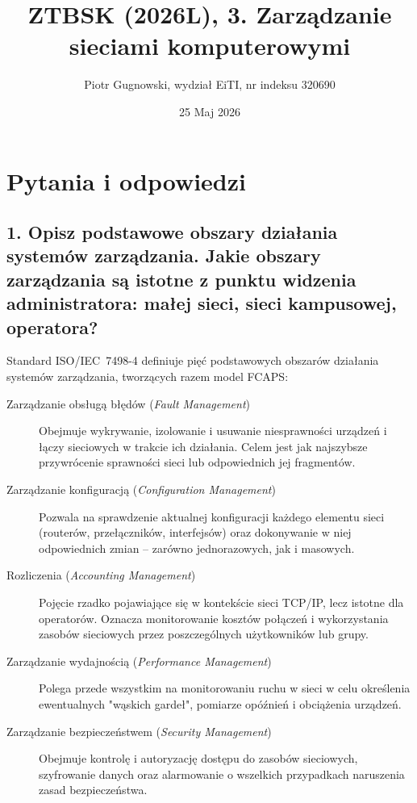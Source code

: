 \documentclass[12pt,a4paper]{article}
\title{ZTBSK (2026L), 3. Zarządzanie sieciami komputerowymi}
\author{Piotr Gugnowski, wydział EiTI, nr indeksu 320690}
\date{25 Maj 2026}
\begin{document}
\maketitle

\section*{Pytania i odpowiedzi}

\subsection*{1. Opisz podstawowe obszary działania systemów zarządzania. Jakie
obszary zarządzania są istotne z punktu widzenia administratora: małej sieci,
sieci kampusowej, operatora?}

Standard ISO/IEC~7498-4 definiuje pięć podstawowych obszarów działania systemów
zarządzania, tworzących razem model FCAPS:

\begin{description}
  \item[Zarządzanie obsługą błędów (\emph{Fault Management})]
        Obejmuje wykrywanie, izolowanie i usuwanie niesprawności urządzeń
        i łączy sieciowych w trakcie ich działania. Celem jest jak najszybsze
        przywrócenie sprawności sieci lub odpowiednich jej fragmentów.
  \item[Zarządzanie konfiguracją (\emph{Configuration Management})]
        Pozwala na sprawdzenie aktualnej konfiguracji każdego elementu sieci
        (routerów, przełączników, interfejsów) oraz dokonywanie w niej odpowiednich
        zmian -- zarówno jednorazowych, jak i masowych.
  \item[Rozliczenia (\emph{Accounting Management})]
        Pojęcie rzadko pojawiające się w kontekście sieci TCP/IP, lecz istotne
        dla operatorów. Oznacza monitorowanie kosztów połączeń i wykorzystania
        zasobów sieciowych przez poszczególnych użytkowników lub grupy.
  \item[Zarządzanie wydajnością (\emph{Performance Management})]
        Polega przede wszystkim na monitorowaniu ruchu w sieci w celu określenia
        ewentualnych "wąskich gardeł", pomiarze opóźnień i obciążenia urządzeń.
  \item[Zarządzanie bezpieczeństwem (\emph{Security Management})]
        Obejmuje kontrolę i autoryzację dostępu do zasobów sieciowych, szyfrowanie
        danych oraz alarmowanie o wszelkich przypadkach naruszenia zasad
        bezpieczeństwa.
\end{description}
\end{document}
